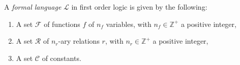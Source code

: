 \documentclass[../../main.tex]{subfiles}
\begin{document}
\begin{definition}\cite[Definition 1.1.1]{Mar02}
    A \textit{formal language} $\mathcal{L}$ in first order logic is given by the following:
    \begin{enumerate}
        \item A set $\mathcal{F}$ of functions $f$ of $n_f$ variables, with $n_f \in \mathbb{Z}^+$ a positive integer,
        \item A set $\mathcal{R}$ of $n_r$-ary relations $r$, with $n_r \in \mathbb{Z}^+$ a positive integer,
        \item A set $\mathcal{C}$ of constants.
    \end{enumerate}
\end{definition}
\end{document}
